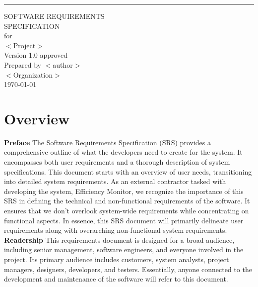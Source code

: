 \documentclass{scrreprt}
\def\myversion{1.0 }
\begin{document}
\begin{flushright}
    \rule{16cm}{5pt}\vskip1cm
    \begin{bfseries}
        \Huge{SOFTWARE REQUIREMENTS\\ SPECIFICATION}\\
        \vspace{1.9cm}
        for\\
        \vspace{1.9cm}
        $<$Project$>$\\
        \vspace{1.9cm}
        \LARGE{Version \myversion approved}\\
        \vspace{1.9cm}
        Prepared by $<$author$>$\\
        \vspace{1.9cm}
        $<$Organization$>$\\
        \vspace{1.9cm}
        \today\\
    \end{bfseries}
\end{flushright}

\tableofcontents
\chapter{Overview}
{\LARGE\textbf{Preface}}
\newline
\newline
The Software Requirements Specification (SRS) provides a comprehensive outline of what the developers need to create for the system. It encompasses both user requirements and a thorough description of system specifications. This document starts with an overview of user needs, transitioning into detailed system requirements.
As an external contractor tasked with developing the system, Efficiency Monitor, we recognize the importance of this SRS in defining the technical and non-functional requirements of the software. It ensures that we don't overlook system-wide requirements while concentrating on functional aspects.
In essence, this SRS document will primarily delineate user requirements along with overarching non-functional system requirements.
\newline
\newline
{\LARGE\textbf{Readership}}
\newline
\newline
This requirements document is designed for a broad audience, including senior management, software engineers, and everyone involved in the project. Its primary audience includes customers, system analysts, project managers, designers, developers, and testers. Essentially, anyone connected to the development and maintenance of the software will refer to this document.
\end{document}
